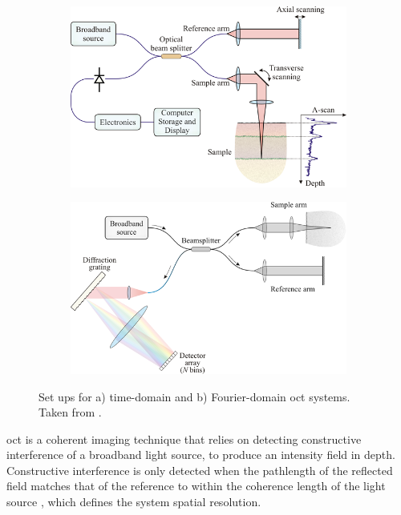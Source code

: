 \begin{figure}
	\centering
    \begin{subfigure}{0.47\textwidth}
    	\centering
        \includegraphics[width=\textwidth]{bground_figs/time_domain}
    \end{subfigure}
    \quad
    \begin{subfigure}{0.47\textwidth}
    	\centering
        \includegraphics[width=\textwidth]{bground_figs/fourier_domain.png}
    \end{subfigure}
	\caption{Set ups for a) time-domain and b) Fourier-domain \ac{oct} systems. Taken from \cite{optical+biomedical_engineering_laboratory_introduction_nodate}.}
    \label{oct_domains}	
\end{figure}

\ac{oct} is a coherent imaging technique that relies on detecting constructive interference of a broadband light source, to produce an intensity field in depth. Constructive interference is only detected when the pathlength of the reflected field matches that of the reference to within the coherence length of the light source \cite{wijesinghe_improving_2017}, which defines the system spatial resolution. 

